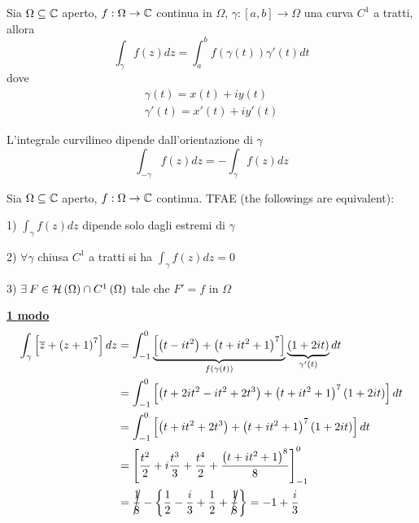 \begin{defn}
Sia $\Omega \subseteq \mathbb{C} $ aperto, $f:\Omega \rightarrow \mathbb{C} $ continua in $\Omega $, $\gamma :\left[ a, b\right]\rightarrow \Omega $ una curva $C^{1}$ a tratti, allora
\begin{equation*}
\int\nolimits_{\gamma} f(z) dz = \int\nolimits^{b}_{a} f\left(\gamma (t)\right) \gamma'(t) dt
\end{equation*}
dove
\begin{gather*}
\gamma (t) = x(t) + iy(t)\\
\gamma'(t) = x'(t) + iy'(t)
\end{gather*}
\end{defn}
\begin{rem}
L'integrale curvilineo dipende dall'orientazione di $\gamma $
\begin{equation*}
\int\nolimits_{- \gamma} f(z) dz = -\int\nolimits_{\gamma} f(z) dz
\end{equation*}
\end{rem}
\begin{thm}
Sia $\Omega \subseteq \mathbb{C} $ aperto, $f:\Omega \rightarrow \mathbb{C} $ continua. TFAE (the followings are equivalent):

1) $\int_{\gamma} f(z) dz$ dipende solo dagli estremi di $\gamma $

2) $\forall \gamma $ chiusa $C^{1}$ a tratti si ha $\int_{\gamma} f(z) dz = 0$

3) $\exists F\in \Hc \left(\Omega \right) \cap C^{1}\left(\Omega \right)$ tale che $F' = f$ in $\Omega $
\end{thm}
\textbf{\underline{1 modo}}
\begin{align*}
\int\nolimits_{\gamma}\left[\overline{z} + \left(z + 1\right)^{7}\right] dz & = \int\nolimits^{0}_{- 1}\underbrace{\left[\left(t - it^{2}\right) + \left(t + it^{2} + 1\right)^{7}\right]}_{f\left(\gamma (t)\right)}\underbrace{\left(1 + 2it\right)}_{\gamma'(t)} dt\\
 & = \int\nolimits^{0}_{- 1}\left[\left(t + 2it^{2} - it^{2} + 2t^{3}\right) + \left(t + it^{2} + 1\right)^{7}\left(1 + 2it\right)\right] dt\\
 & = \int\nolimits^{0}_{- 1}\left[\left(t + it^{2} + 2t^{3}\right) + \left(t + it^{2} + 1\right)^{7}\left(1 + 2it\right)\right] dt\\
 & = \left[\frac{t^{2}}{2} + i\frac{t^{3}}{3} + \frac{t^{4}}{2} + \frac{\left(t + it^{2} + 1\right)^{8}}{8}\right]^{0}_{- 1}\\
 & = \cancel{\frac{1}{8}} - \left\{\frac{1}{2} - \frac{i}{3} + \frac{1}{2} + \cancel{\frac{1}{8}}\right\} = - 1 + \frac{i}{3}
\end{align*}
